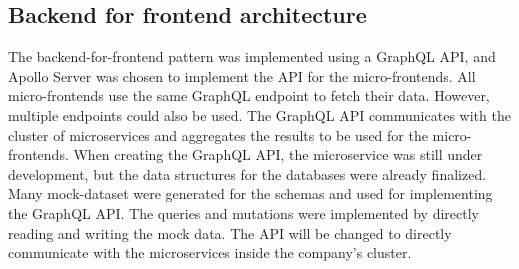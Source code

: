 \subsection{Backend for frontend architecture}

The backend-for-frontend pattern was implemented using a GraphQL API, and Apollo Server was chosen to implement the API for the micro-frontends. All micro-frontends use the same GraphQL endpoint to fetch their data. However, multiple endpoints could also be used. The GraphQL API communicates with the cluster of microservices and aggregates the results to be used for the micro-frontends. When creating the GraphQL API, the microservice was still under development, but the data structures for the databases were already finalized. Many mock-dataset were generated for the schemas and used for implementing the GraphQL API. The queries and mutations were implemented by directly reading and writing the mock data. The API will be changed to directly communicate with the microservices inside the company's cluster.
